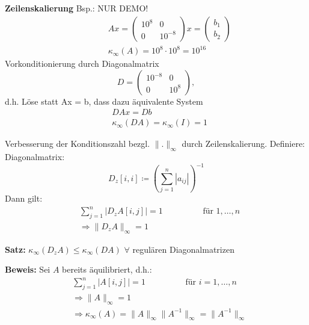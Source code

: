 \textbf{Zeilenskalierung}
Bsp.: NUR DEMO!
\begin{equation*}
  \begin{aligned}
    \hspace{1cm} &Ax = \begin{pmatrix} 10^8 & 0 \\ 0 & 10^{-8} \end{pmatrix} x = \begin{pmatrix}b_1 \\ b_2\end{pmatrix} \\
    &\kappa_\infty\left(A\right) = 10^8 \cdot 10^8 = 10^{16}
  \end{aligned}
\end{equation*}
Vorkonditionierung durch Diagonalmatrix
\begin{equation*}
  D = \begin{pmatrix}10^{-8} & 0 \\ 0 & 10^8\end{pmatrix},
\end{equation*}
d.h. Löse statt Ax = b, dass dazu äquivalente System
\begin{equation*}
  \begin{aligned}
    &DAx = Db \\
    &\kappa_\infty\left(DA\right) = \kappa_\infty\left(I\right) = 1
	\end{aligned}	
\end{equation*}

Verbesserung der Konditionszahl bezgl. $\|.\|_\infty$ durch Zeilenskalierung.
Definiere: Diagonalmatrix:
\begin{equation*}
  D_z \left[ i,i \right] \coloneqq \left(\sum\limits_{j=1}^{n}{\left|a_{ij}\right|}\right)^{-1} %
\end{equation*}
Dann gilt:
\begin{equation*}
  \begin{aligned}
    &\sum\limits_{j=1}^{n}{\left|D_zA\left[i,j\right]\right|} = 1  \hspace{2cm} \text{für } 1, \ldots, n \\
    &\Rightarrow \|D_zA\|_\infty = 1
		\end{aligned}
\end{equation*}

\textbf{Satz:}
$\kappa_\infty\left(D_zA\right) \leq \kappa_\infty\left(DA\right)$ \hspace{2cm} $\forall$ regulären Diagonalmatrizen

\textbf{Beweis:}
Sei $A$ bereits äquilibriert, d.h.:
\begin{align*}
    &\sum\limits_{j=1}^{n}{\left|A\left[i,j\right]\right|} = 1 \hspace{2cm} \text{für } i = 1, \dots, n \\
	  &\Rightarrow \|A\|_\infty = 1 \\
	  &\Rightarrow \kappa_\infty\left(A\right) = \|A\|_\infty \|A^{-1}\|_\infty = \|A^{-1}\|_\infty
\end{align*}

